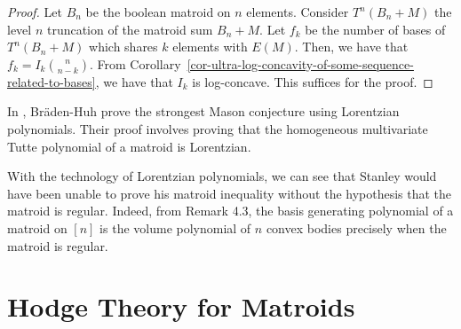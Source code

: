 \documentclass{puthesis-UG}
\begin{document}
\begin{proof}
	Let $B_n$ be the boolean matroid on $n$ elements. Consider $T^n (B_n + M)$ the level $n$ truncation of the matroid sum $B_n + M$. Let $f_k$ be the number of bases of $T^n(B_n + M)$ which shares $k$ elements with $E(M)$. Then, we have that $f_k = I_k \binom{n}{n-k}$. From Corollary~\ref{cor-ultra-log-concavity-of-some-sequence-related-to-bases}, we have that $I_k$ is log-concave. This suffices for the proof. 
\end{proof}

\begin{remark}
	In \cite{lorentzian-polynomials}, Br\"aden-Huh prove the strongest Mason conjecture using Lorentzian polynomials. Their proof involves proving that the homogeneous multivariate Tutte polynomial of a matroid is Lorentzian. 
\end{remark}

\begin{remark}
	With the technology of Lorentzian polynomials, we can see that Stanley would have been unable to prove his matroid inequality without the hypothesis that the matroid is regular. Indeed, from Remark 4.3, the basis generating polynomial of a matroid on $[n]$ is the volume polynomial of $n$ convex bodies precisely when the matroid is regular.
\end{remark}

\chapter{Hodge Theory for Matroids}
\end{document}
